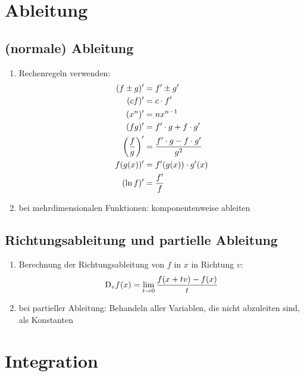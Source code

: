 \documentclass[ngerman,a4paper]{article}
\begin{document}
\section{Ableitung}
\subsection{(normale) Ableitung}
\begin{enumerate}[label=\textbf{\arabic*.}]
	\item Rechenregeln verwenden:
	\begin{align}
		(f\pm g)' &= f'\pm g'\notag \\
		(cf)' &= c\cdot f'\notag \\
		(x^n)' &= nx^{n-1}\notag \\
		(fg)' &= f'\cdot g + f\cdot g' \notag \\
		\left(\frac{f}{g}\right)' &= \frac{f'\cdot g-f\cdot g'}{g^2}\notag \\
		f(g(x))' &= f'(g(x))\cdot g'(x)\notag \\
		(\ln f)' &= \frac{f'}{f}\notag
	\end{align}
	\item bei mehrdimensionalen Funktionen: komponentenweise ableiten
\end{enumerate}

\subsection{Richtungsableitung und partielle Ableitung}
\begin{enumerate}[label=\textbf{\arabic*.}]
	\item Berechnung der Richtungsableitung von $f$ in $x$ in Richtung $v$:
	\begin{align}
		\mathrm{D}_vf(x)=\lim\limits_{t\to 0}\frac{f(x+tv)-f(x)}{t}\notag
	\end{align}
	\item bei partieller Ableitung: Behandeln aller Variablen, die nicht abzuleiten sind, als Konstanten
\end{enumerate}

\section{Integration}
\end{document}
